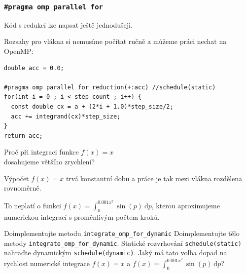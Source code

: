 \documentclass[usenames,dvipsnames,9pt]{beamer}
\begin{document}
\begin{frame}[fragile]
  \frametitle{\texttt{\#pragma omp parallel for}}

  Kód s redukcí lze napsat ještě jednodušeji.

  Rozsahy pro vlákna si nemusíme počítat ručně a můžeme práci nechat na OpenMP:

  \begin{verbatim}
double acc = 0.0;

#pragma omp parallel for reduction(+:acc) //schedule(static)
for(int i = 0 ; i < step_count ; i++) {
  const double cx = a + (2*i + 1.0)*step_size/2;
  acc += integrand(cx)*step_size;
}
return acc;
  \end{verbatim}
\end{frame}

\begin{frame}
  \begin{center}
    \Large
    Proč při integraci funkce $f(x)=x$ \\ dosahujeme většího zrychlení?
  \end{center}

  \pause\vspace{1.5em}

  Výpočet $f(x)=x$ trvá konstantní dobu a práce je tak mezi vlákna rozdělena rovnoměrně.

  To neplatí o funkci $f(x)=\int_0^{0.001x^2} \sin(p) \ \mathrm{d}p$, kterou aproximujeme numerickou integrací s proměnlivým počtem kroků.
\end{frame}

{
\begin{frame}[fragile]
  \begin{block}{Doimplementujte metodu \texttt{integrate\_omp\_for\_dynamic}}
    Doimplementujte tělo metody \texttt{integrate\_omp\_for\_dynamic}.
    Statické rozvrhování \texttt{schedule(static)} nahraďte dynamickým \texttt{schedule(dynamic)}.
    Jaký má tato volba dopad na rychlost numerické integrace $f(x)=x$ a $f(x)=\int_0^{0.001x^2} \sin(p) \ \mathrm{d}p$?
  \end{block}
\end{frame}
}
\end{document}
